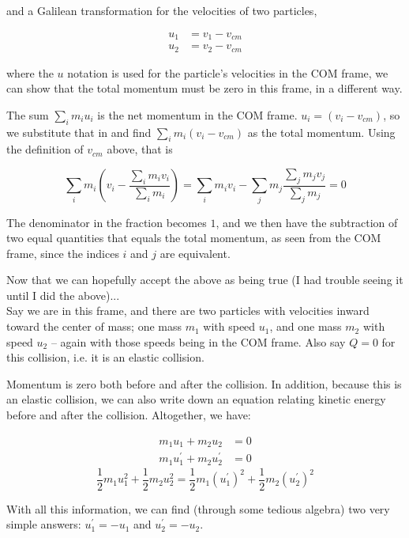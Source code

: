 \documentclass[12pt,a4paper]{report}
\begin{document}
and a Galilean transformation for the velocities of two particles,

\begin{align}
u_1 &= v_1 - v_{cm}\\
u_2 &= v_2 - v_{cm}
\end{align}

where the $u$ notation is used for the particle's velocities in the COM frame, we can show that the total momentum must be zero in this frame, in a different way.

The sum $\sum_i m_i u_i$ is the net momentum in the COM frame. $u_i = (v_i - v_{cm})$, so we substitute that in and find $\sum_i m_i (v_i - v_{cm})$ as the total momentum. Using the definition of $v_{cm}$ above, that is

\begin{equation}
\sum_i m_i \left(v_i - \frac{\sum_i m_i v_i}{\sum_i m_i}\right) = \sum_i m_i v_i - \sum_j m_j \frac{\sum_j m_j v_j}{\sum_j m_j} = 0
\end{equation}

The denominator in the fraction becomes $1$, and we then have the subtraction of two equal quantities that equals the total momentum, as seen from the COM frame, since the indices $i$ and $j$ are equivalent.

Now that we can hopefully accept the above as being true (I had trouble seeing it until I did the above)...\\
Say we are in this frame, and there are two particles with velocities inward toward the center of mass; one mass $m_1$ with speed $u_1$, and one mass $m_2$ with speed $u_2$ -- again with those speeds being in the COM frame. Also say $Q = 0$ for this collision, i.e. it is an elastic collision.

Momentum is zero both before and after the collision. In addition, because this is an elastic collision, we can also write down an equation relating kinetic energy before and after the collision. Altogether, we have:

\begin{align}
m_1 u_1 + m_2 u_2 &= 0\\
m_1 u_1^{'} + m_2 u_2^{'} &= 0
\end{align}
\begin{equation}
\frac{1}{2} m_1 u_1^2 + \frac{1}{2} m_2 u_2^2 = \frac{1}{2} m_1 (u_1^{'})^2 + \frac{1}{2} m_2 (u_2^{'})^2
\end{equation}

With all this information, we can find (through some tedious algebra) two very simple answers: $u_1^{'} = -u_1$ and $u_2^{'} = -u_2$.
\end{document}
